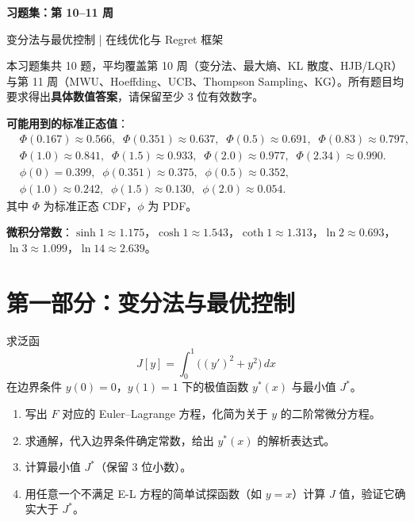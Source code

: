 \documentclass[12pt, a4paper]{ctexart}
\begin{document}
\begin{center}
{\LARGE\bfseries 习题集：第 10--11 周}

\vspace{0.5em}
{\large 变分法与最优控制 \;|\; 在线优化与 Regret 框架}
\end{center}

\vspace{1em}

\begin{convention}
本习题集共 10 题，平均覆盖第 10 周（变分法、最大熵、KL 散度、HJB/LQR）与第 11 周（MWU、Hoeffding、UCB、Thompson Sampling、KG）。所有题目均要求得出\textbf{具体数值答案}，请保留至少 3 位有效数字。

\medskip
\textbf{可能用到的标准正态值}：
\begin{align*}
&\Phi(0.167) \approx 0.566, \;\; \Phi(0.351) \approx 0.637, \;\; \Phi(0.5) \approx 0.691, \;\; \Phi(0.83) \approx 0.797, \\
&\Phi(1.0) \approx 0.841, \;\; \Phi(1.5) \approx 0.933, \;\; \Phi(2.0) \approx 0.977, \;\; \Phi(2.34) \approx 0.990. \\
&\phi(0) = 0.399, \;\; \phi(0.351) \approx 0.375, \;\; \phi(0.5) \approx 0.352, \\
&\phi(1.0) \approx 0.242, \;\; \phi(1.5) \approx 0.130, \;\; \phi(2.0) \approx 0.054.
\end{align*}
其中 $\Phi$ 为标准正态 CDF，$\phi$ 为 PDF。

\medskip
\textbf{微积分常数}：$\sinh 1 \approx 1.175$，$\cosh 1 \approx 1.543$，$\coth 1 \approx 1.313$，$\ln 2 \approx 0.693$，$\ln 3 \approx 1.099$，$\ln 14 \approx 2.639$。
\end{convention}

\bigskip

\section*{第一部分：变分法与最优控制}

\begin{problem}
求泛函
\[
J[y] = \int_0^1 \Big( (y')^2 + y^2 \Big) \, dx
\]
在边界条件 $y(0) = 0$，$y(1) = 1$ 下的极值函数 $y^*(x)$ 与最小值 $J^*$。

\begin{enumerate}[label=(\alph*)]
    \item 写出 $F$ 对应的 Euler--Lagrange 方程，化简为关于 $y$ 的二阶常微分方程。
    \item 求通解，代入边界条件确定常数，给出 $y^*(x)$ 的解析表达式。
    \item 计算最小值 $J^*$（保留 3 位小数）。
    \item 用任意一个不满足 E-L 方程的简单试探函数（如 $y = x$）计算 $J$ 值，验证它确实大于 $J^*$。
\end{enumerate}
\end{problem}
\end{document}
